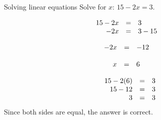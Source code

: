     
\begin{wex}{Solving linear equations }
{
Solve for $x$: $15-2x=3$.
}
{

\begin{equation*}
    \begin{array}{cclc}\hfill 15-2x& =& 3\hfill & \\
	    \hfill -2x& =& 3-15\hfill & \hfill 
	    
    \end{array}
\end{equation*}

\begin{equation*}
    \begin{array}{cccc}\hfill -2x& =&-12\hfill & 
	    
    \end{array}
\end{equation*}

\begin{equation*}
    \begin{array}{cccc}\hfill x& =&6\hfill & 
	    
    \end{array}
\end{equation*}

\begin{equation*}
\begin{array}{ccc}\hfill 15 - 2(6)& =& 3\hfill \\
 \hfill 15-12& =& 3\hfill \\
\hfill 3 &=& 3\hfill
\end{array}
\end{equation*}
Since both sides are equal, the answer is correct. 
}
\end{wex}

